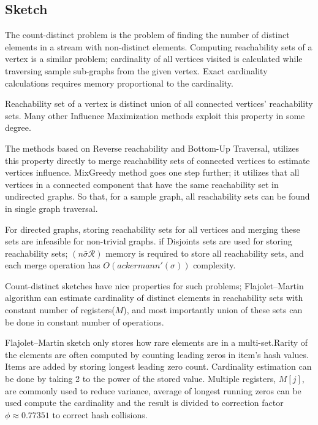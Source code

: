 \documentclass[10pt,journal,compsoc]{IEEEtran}
\begin{document}
\subsection{Sketch}\label{sec:sketch}
The count-distinct problem is the problem of finding the number of distinct elements in a stream with non-distinct elements. Computing reachability sets of a vertex is a similar problem; cardinality of all vertices visited is calculated while traversing sample sub-graphs from the given vertex. Exact cardinality calculations requires memory proportional to the cardinality. 

Reachability set of a vertex is distinct union of all connected vertices' reachability sets. Many other Influence Maximization methods exploit this property in some degree. 

The methods based on Reverse reachability and Bottom-Up Traversal, utilizes this property directly to merge reachability sets of connected vertices to estimate vertices influence.
MixGreedy method goes one step further; it utilizes that all vertices in a connected component that have the same reachability set in undirected graphs. So that, for a sample graph, all reachability sets can be found in single graph traversal. 

For directed graphs, storing reachability sets for all vertices and merging these sets are infeasible for non-trivial graphs. 
if Disjoints sets are used for storing reachability sets; $(n\bar{\sigma}\mathcal{R})$ memory is required to store all reachability sets, and each merge operation has $O(ackermann'(\sigma))$ complexity.

Count-distinct sketches have nice properties for such problems; Flajolet–Martin algorithm can estimate cardinality of distinct elements in reachability sets with constant number of registers($M$), and most importantly union of these sets can be done in constant number of operations.

Flajolet–Martin sketch only stores how rare elements are in a multi-set.Rarity of the elements are often computed by counting leading zeros in item's hash values. Items are added by storing longest leading zero count. Cardinality estimation can be done by taking 2 to the power of the stored value. Multiple registers, $M[j]$, are commonly used to reduce variance, average of longest running zeros can be used compute the cardinality and the result is divided to correction factor $\phi \approx 0.77351$ to correct hash collisions.
\end{document}
